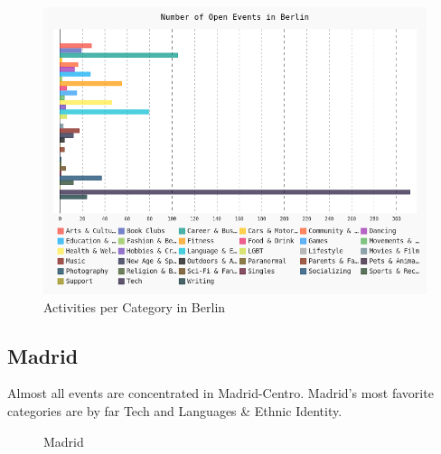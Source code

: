 \begin{figure}[!htp]
	\includegraphics[width=1\linewidth]{../plotting/pngs/categories/Berlin.png}
	\caption{Activities per Category in Berlin}\label{fig:berlinbar}	
\end{figure}


\subsection*{Madrid}

Almost all events are concentrated in Madrid-Centro. Madrid's most favorite categories are by far Tech and Languages \& Ethnic Identity. 

\begin{figure}[!htp]
	\hfill
	\caption{Madrid}
\end{figure}

